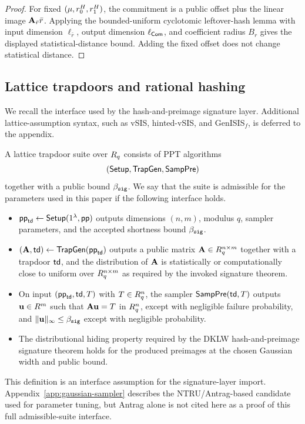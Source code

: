 \begin{proof}
For fixed $(\mathbf{\mu},r_0^H,r_1^H)$, the commitment is a public offset plus the linear image
$\mathbf{A}_{\bar r}\bar r$.  Applying the bounded-uniform cyclotomic leftover-hash lemma with input dimension
$\ell_{\bar r}$, output dimension $\ell_{\mathsf{Com}}$, and coefficient radius $B_r$ gives the displayed
statistical-distance bound.  Adding the fixed offset does not change statistical distance.
\end{proof}

\subsection{Lattice trapdoors and rational hashing}
\label{subsec:prelim-vsis}
We recall the interface used by the hash-and-preimage signature layer.  Additional lattice-assumption
syntax, such as vSIS, hinted-vSIS, and GenISIS$_f$, is deferred to the appendix.

\begin{definition}\label{def:trapdoor-suite}
A lattice trapdoor suite over $R_q$ consists of PPT algorithms
\[
  (\mathsf{Setup},\mathsf{TrapGen},\mathsf{SampPre})
\]
together with a public bound $\beta_{\mathtt{sig}}$.  We say that the suite is admissible for the parameters used in
this paper if the following interface holds.
\begin{itemize}[leftmargin=1.25em]
  \item $\mathsf{pp}_{\mathsf{td}}\gets\mathsf{Setup}(1^\lambda,\mathsf{pp})$ outputs dimensions $(n,m)$, modulus
  $q$, sampler parameters, and the accepted shortness bound $\beta_{\mathtt{sig}}$.
  \item $(\mathbf{A},\mathsf{td})\gets\mathsf{TrapGen}(\mathsf{pp}_{\mathsf{td}})$ outputs a public matrix
  $\mathbf{A}\in R_q^{n\times m}$ together with a trapdoor $\mathsf{td}$, and the distribution of $\mathbf{A}$ is
  statistically or computationally close to uniform over $R_q^{n\times m}$ as required by the invoked
  signature theorem.
  \item On input $(\mathsf{pp}_{\mathsf{td}},\mathsf{td},T)$ with $T\in R_q^n$, the sampler
  $\mathsf{SampPre}(\mathsf{td},T)$ outputs $\mathbf{u}\in R^m$ such that $\mathbf{A}\mathbf{u}=T$ in $R_q^n$, except with
  negligible failure probability, and $\|\mathbf{u}\|_\infty\le \beta_{\mathtt{sig}}$ except with negligible probability.
  \item The distributional hiding property required by the DKLW hash-and-preimage signature theorem holds for
  the produced preimages at the chosen Gaussian width and public bound.
\end{itemize}
This definition is an interface assumption for the signature-layer import.  Appendix~\ref{app:gaussian-sampler}
describes the NTRU/Antrag-based candidate used for parameter tuning, but Antrag alone is not cited here as a
proof of this full admissible-suite interface.
\end{definition}

